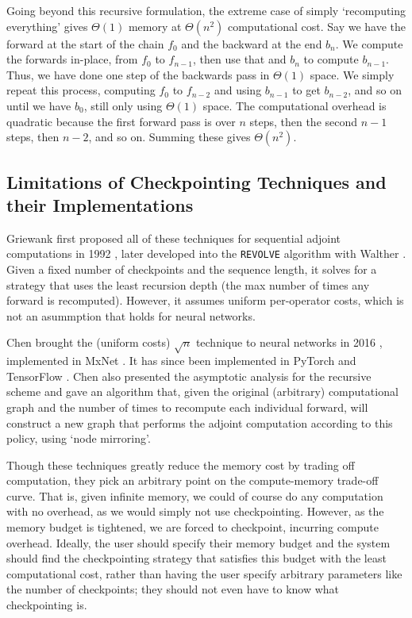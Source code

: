 Going beyond this recursive formulation, the extreme case of simply `recomputing everything' gives \(\Theta(\mathrm{1})\) memory at \(\Theta(n^2)\) computational cost.
Say we have the forward at the start of the chain \(f_0\) and the backward at the end \(b_n\).
We compute the forwards in-place, from \(f_0\) to \(f_{n-1}\), then use that and \(b_n\) to compute \(b_{n-1}\).
Thus, we have done one step of the backwards pass in \(\Theta(\mathrm{1})\) space.
We simply repeat this process, computing \(f_0\) to \(f_{n-2}\) and using \(b_{n-1}\) to get \(b_{n-2}\), and so on until we have \(b_0\), still only using \(\Theta(\mathrm{1})\) space. The computational overhead is quadratic because the first forward pass is over \(n\) steps, then the second \(n-1\) steps, then \(n-2\), and so on. Summing these gives \(\Theta(n^2)\).

\subsection{Limitations of Checkpointing Techniques and their Implementations}
Griewank first proposed all of these techniques for sequential adjoint computations in 1992 \cite{Griewank1992}, later developed into the \texttt{REVOLVE} algorithm with Walther \cite{Revolve2000}.
Given a fixed number of checkpoints and the sequence length, it solves for a strategy that uses the least recursion depth (the max number of times any forward is recomputed).
However, it assumes uniform per-operator costs, which is not an asummption that holds for neural networks.

Chen brought the (uniform costs) \(\sqrt{n}\) technique to neural networks in 2016 \cite{Chen2016}, implemented in MxNet \cite{mxnet-memonger}.
It has since been implemented in PyTorch \cite{torch-memonger} and TensorFlow \cite{openai-checkpointing}.
Chen also presented the asymptotic analysis for the recursive scheme and gave an algorithm that, given the original (arbitrary) computational graph and the number of times to recompute each individual forward, will construct a new graph that performs the adjoint computation according to this policy, using `node mirroring'.

Though these techniques greatly reduce the memory cost by trading off computation, they pick an arbitrary point on the compute-memory trade-off curve.
That is, given infinite memory, we could of course do any computation with no overhead, as we would simply not use checkpointing.
However, as the memory budget is tightened, we are forced to checkpoint, incurring compute overhead.
Ideally, the user should specify their memory budget and the system should find the checkpointing strategy that satisfies this budget with the least computational cost, rather than having the user specify arbitrary parameters like the number of checkpoints;
they should not even have to know what checkpointing is.

